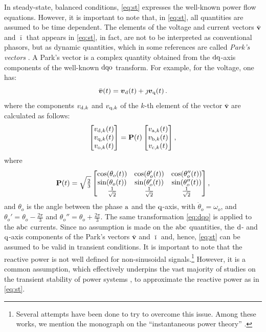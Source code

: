 \documentclass[journal, twocolumn, letter]{IEEEtran}
\newcommand{\bfg}[1]{\boldsymbol{#1}}
\newcommand{\bfp}[1]{\bar{\boldsymbol{#1}}}
\newcommand{\bfb}[1]{\boldsymbol{\rm #1}}
\renewcommand{\to}{\theta_o}
\newcommand{\ii}{\imath}
\newcommand{\jj}{\jmath}
\newcommand{\ivec}{\bfp \ii}
\newcommand{\vvec}{\bfp v}
\begin{document}
 In steady-state, balanced conditions, \eqref{eq:st}
expresses the well-known power flow equations.  However, it is
important to note that, in \eqref{eq:st}, all quantities are assumed
to be time dependent.  The elements of the voltage and current vectors
$\bfp v$ and $\bfp \ii$ that appears in \eqref{eq:st}, in fact, are
not to be interpreted as conventional phasors, but as dynamic
quantities, which in some references are called \textit{Park's
  vectors} \cite{Saccomanno:2003, FDF:2020}.
A Park's vector is a complex quantity obtained from the $\rm dq$-axis
components of the well-known $\rm dqo$ transform.   For
example, for the voltage, one has:
\begin{equation}
  \label{eq:vdq}
  \vvec(t) = \bfg v_{\rm d}(t) + \jj \bfg v_{\rm q}(t) \, .
\end{equation}
where the components $v_{{\rm d}, k}$ and $v_{{\rm q}, k}$ of the
$k$-th element of the vector $\vvec$ are calculated as follows:
\begin{equation}
  \label{eq:dqo}
  \begin{bmatrix}
    v_{{\rm d}, k}(t) \\ v_{{\rm q}, k}(t) \\ v_{{\rm o}, k}(t)
  \end{bmatrix} =
  \bfb P(t) 
  \begin{bmatrix}
    v_{{\rm a}, k}(t) \\ v_{{\rm b}, k}(t) \\ v_{{\rm c}, k}(t)
  \end{bmatrix} ,
\end{equation}
where 
\begin{equation}
  \label{eq:park}
  \bfb P(t) = 
  \sqrt{\tfrac{2}{3}}
  \begin{bmatrix}
    \cos(\to(t) ) & \cos(\to'(t)) & \cos(\to''(t)) \\
    \sin(\to(t) ) & \sin(\to'(t)) & \sin(\to''(t)) \\
    \frac{1}{\sqrt{2}} & \frac{1}{\sqrt{2}} & \frac{1}{\sqrt{2}}
  \end{bmatrix} ,
\end{equation}
and $\to$ is the angle between the phase $\rm a$ and the $\rm q$-axis,
with $\dot \to = \omega_o$, and $\to' = \to - \frac {2\pi}{3}$ and
$\to'' = \to + \frac {2\pi}{3}$.   The same
transformation \eqref{eq:dqo} is applied to the $\rm abc$ currents.
Since no assumption is made on the $\rm abc$ quantities, the $\rm d$-
and $\rm q$-axis components of the Park's vectors $\vvec$ and $\ivec$
and, hence,  \eqref{eq:st} can be assumed to be valid in
transient conditions.
It is important to note that the reactive power is not well defined
for non-sinusoidal signals.\footnote{Several attempts have
  been done to try to overcome this issue.  Among these works, we
  mention the monograph on the ``instantaneous power theory''
  \cite{IPT}.}  However, it is a common assumption, which effectively
underpins the vast majority of studies on the transient stability of
power systems \cite{Sauer:1998}, to approximate the reactive power as
in \eqref{eq:st}.
\end{document}
